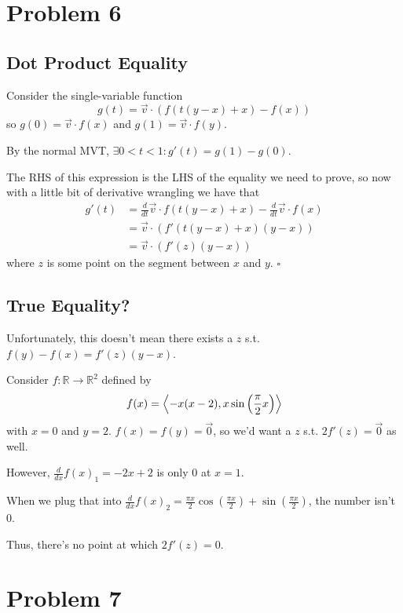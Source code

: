 \documentclass[12pt]{article}
\newcommand{\R}{\mathbb{R}}
\begin{document}
\pagebreak

\section{Problem 6}

\subsection{Dot Product Equality}

Consider the single-variable function
\[g(t)=\vec{v} \cdot (f(t(y-x)+x)-f(x))\]
so $g(0)=\vec{v} \cdot f(x)$ and $g(1)=\vec{v} \cdot f(y)$.

By the normal MVT, $\exists 0 < t < 1: g'(t)=g(1) - g(0)$.

The RHS of this expression is the LHS of the equality we need to prove,
so now with a little bit of derivative wrangling we have that
\begin{align*}
  g'(t)
   & = \frac{d}{dt} \vec{v} \cdot f(t(y-x)+x) - \frac{d}{dt} \vec{v} \cdot f(x) \\
   & = \vec{v} \cdot (f'(t(y-x)+x)(y-x))                                        \\
   & = \vec{v} \cdot (f'(z)(y-x))
\end{align*}
where $z$ is some point on the segment between $x$ and $y$. $\square$

\subsection{True Equality?}

Unfortunately, this doesn't mean there exists a $z$ s.t. $f(y)-f(x)=f'(z)(y-x)$.

Consider $f: \R \to \R^2$ defined by
\[f(x)=\Braket{-x(x-2), x\sin\left(\frac{\pi}{2}x\right)}\]
with $x=0$ and $y=2$.
$f(x)=f(y)=\vec{0}$, so we'd want a $z$ s.t. $2f'(z)=\vec{0}$ as well.

However, $\frac{d}{dx} f(x)_1=-2x+2$ is only $0$ at $x=1$.

When we plug that into
$\frac{d}{dx} f(x)_2=\frac{\pi x}{2}\cos\left(\frac{\pi x}{2}\right)+\sin\left(\frac{\pi x}{2}\right)$,
the number isn't $0$.

Thus, there's no point at which $2f'(z)=0$.

\pagebreak

\section{Problem 7}
\end{document}
